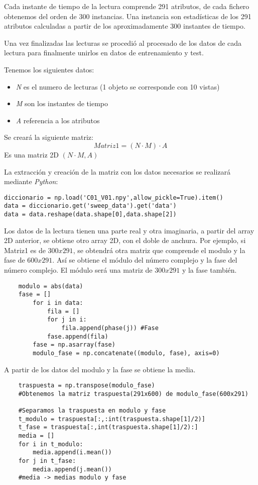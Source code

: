 Cada instante de tiempo de la lectura comprende 291 atributos, de cada fichero obtenemos del orden de 300 instancias. Una instancia son estadísticas de los 291 atributos calculadas a partir de los aproximadamente 300 instantes de tiempo.

Una vez finalizadas las lecturas se procedió al procesado de los datos de cada lectura para finalmente unirlos en datos de entrenamiento y test.

Tenemos los siguientes datos:
\begin{itemize}
\item \textit{N} es el numero de lecturas (1 objeto se corresponde con 10 vistas)
\item \textit{M} son los instantes de tiempo
\item \textit{A} referencia a los atributos
\end{itemize}

Se creará la siguiente matriz:
\begin{equation}
	Matriz1 = (N \cdot M) \cdot A
\end{equation}
Es una matriz 2D $(N \cdot M,A)$

La extracción y creación de la matriz con los datos necesarios se realizará mediante \textit{Python}:

\begin{verbatim}
diccionario = np.load('C01_V01.npy',allow_pickle=True).item()
data = diccionario.get('sweep_data').get('data')
data = data.reshape(data.shape[0],data.shape[2])
\end{verbatim}

Los datos de la lectura tienen una parte real y otra imaginaria, a partir del array 2D anterior, se obtiene otro array 2D, con el doble de anchura.
Por ejemplo, si Matriz1 es de $ 300 x 291 $, se obtendrá otra matriz que comprende el modulo y la fase de $ 600 x 291 $. Así se obtiene el módulo del número complejo y la fase del número complejo.
El módulo será una matriz de $ 300 x 291 $ y la fase también.

\begin{verbatim}
	modulo = abs(data)
	fase = []
		for i in data:
			fila = []
			for j in i:
				fila.append(phase(j)) #Fase
			fase.append(fila)
   	 	fase = np.asarray(fase)
   	 	modulo_fase = np.concatenate((modulo, fase), axis=0)
\end{verbatim}

A partir de los datos del modulo y la fase se obtiene la media.
\begin{verbatim}
	traspuesta = np.transpose(modulo_fase)
	#Obtenemos la matriz traspuesta(291x600) de modulo_fase(600x291)

	#Separamos la traspuesta en modulo y fase
	t_modulo = traspuesta[:,:int(traspuesta.shape[1]/2)]
	t_fase = traspuesta[:,int(traspuesta.shape[1]/2):]
	media = []
	for i in t_modulo:
    	media.append(i.mean())
	for j in t_fase:
    	media.append(j.mean())
	#media -> medias modulo y fase
\end{verbatim}

